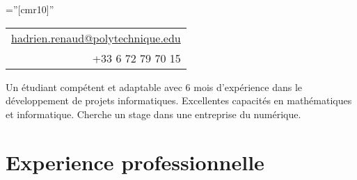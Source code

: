 \documentclass[a4paper,10pt]{article} %
\begin{document}
\pagestyle{empty} %

\font\fb=''[cmr10]'' %



\par{\hfill{}\hfill
\begin{tabular}{r}
\href{mailto:hadrien.renaud@polytechnique.edu}{hadrien.renaud@polytechnique.edu}\\
+33 6 72 79 70 15
\end{tabular}
\bigskip\par} %
\vfill


Un étudiant compétent et adaptable avec 6 mois d'expérience dans le développement de projets informatiques.
Excellentes capacités en mathématiques et informatique.
Cherche un stage dans une entreprise du numérique.


\section{Experience professionnelle}
\end{document}
